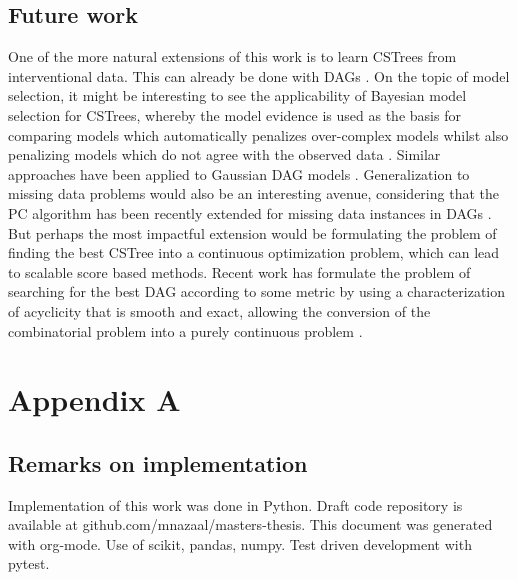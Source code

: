\documentclass{tufte-book}
\begin{document}
\section{Future work}
\label{sec:org8323e12}
One of the more natural extensions of this work is to learn CSTrees from interventional data. This can already be done with DAGs \cite{yang-2018-charac-learn}. On the topic of model selection, it might be interesting to see the applicability of Bayesian model selection for CSTrees, whereby the model evidence is used as the basis for comparing models which automatically penalizes over-complex models whilst also penalizing models which do not agree with the observed data \cite{mackay-1992-bayes-inter}. Similar approaches have been applied to Gaussian DAG models \cite{castelletti-2020-bayes-model}. Generalization to missing data problems would also be an interesting avenue, considering that the PC algorithm has been recently extended for missing data instances in DAGs \cite{tu-2019-causal-discov}. But perhaps the most impactful extension would be formulating the problem of finding the best CSTree into a continuous optimization problem, which can lead to scalable score based methods. Recent work has formulate the problem of searching for the best DAG according to some metric by using a characterization of acyclicity that is smooth and exact, allowing the conversion of the combinatorial problem into a purely continuous problem \cite{zheng-2018-dags-no-tears}.  






 \newpage 






 \newpage 

\chapter{Appendix A}
\label{sec:org6c2a0b4}
\section{Remarks on implementation}
\label{sec:orgcdc8be6}
Implementation of this work was done in Python. Draft code repository is available at github.com/mnazaal/masters-thesis. This document was generated with org-mode. Use of scikit, pandas, numpy. Test driven development with pytest.
\end{document}
